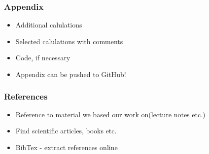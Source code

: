 \documentclass[12pt]{article}
\begin{document}
\subsubsection*{Appendix}

\begin{itemize}
\item Additional calulations
\item Selected calulations with comments
\item Code, if necessary
\item Appendix can be pushed to GitHub!
\end{itemize}

\subsubsection*{References}

\begin{itemize}
\item Reference to material we based our work on(lecture notes etc.)
\item Find scientific articles, books etc.
\item BibTex - extract references online
\end{itemize}





\end{document}
